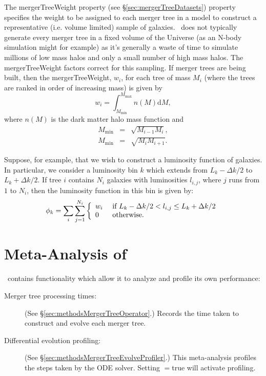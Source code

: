 The {\normalfont \ttfamily mergerTreeWeight} property (see \S\ref{sec:mergerTreeDatasets}) property specifies the weight to be assigned to each merger tree in a model to construct a representative (i.e. volume limited) sample of galaxies. \glc\ does not typically generate every merger tree in a fixed volume of the Universe (as an N-body simulation might for example) as it's generally a waste of time to simulate millions of low mass halos and only a small number of high mass halos. The {\normalfont \ttfamily mergerTreeWeight} factors correct for this sampling. If merger trees are being built, then the {\normalfont \ttfamily mergerTreeWeight}, $w_i$, for each tree of mass $M_i$ (where the trees are ranked in order of increasing mass) is given by
\begin{equation}
 w_i = \int_{M_\mathrm{min}}^{M_\mathrm{max}} n(M) \mathrm{d}M,
\end{equation}
where $n(M)$ is the dark matter halo mass function and
\begin{eqnarray}
 M_\mathrm{min} &=& \sqrt{M_{i-1}M_i}, \\
 M_\mathrm{min} &=& \sqrt{M_i M_{i+1}}.
\end{eqnarray}

Suppose, for example, that we wish to construct a luminosity function of galaxies. In particular, we consider a luminosity bin $k$ which extends from $L_k-\Delta k/2$ to $L_k+\Delta k/2$. If tree $i$ contains $N_i$ galaxies with luminosities $l_{i,j}$, where $j$ runs from $1$ to $N_i$, then the luminosity function in this bin is given by:
\begin{equation}
 \phi_k = \sum_i \sum_{j=1}^{N_i} \left\{ \begin{array}{ll} w_i & \hbox{ if  } L_k-\Delta k/2 < l_{i,j} \le L_k+\Delta k/2 \\ 0 & \hbox{ otherwise.} \end{array} \right.
\end{equation}

\section{Meta-Analysis of \glc}

\glc\ contains functionality which allow it to analyze and profile its own performance:

\begin{description}
  \item[Merger tree processing times:] (See \S\ref{sec:methodsMergerTreeOperator}.) Records the time taken to construct and evolve each merger tree.

  \item[Differential evolution profiling:] (See \S\ref{sec:methodsMergerTreeEvolveProfiler}.) This meta-analysis profiles the steps taken by the ODE solver. Setting {\normalfont \ttfamily [profileOdeEvolver]}$=${\normalfont \ttfamily true} will activate profiling.
\end{description}
